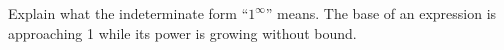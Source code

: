 {Explain what the indeterminate form ``$1^\infty$'' means.}
{The base of an expression is approaching 1 while its power is growing without bound.}
